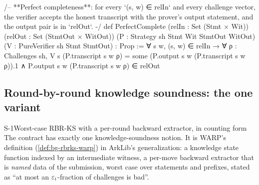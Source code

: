 \begin{leancode}[fontsize=\footnotesize,label={\footnotesize Contract/Security.lean (abridged)}]
/-- **Perfect completeness**: for every `(s, w) ∈ relIn` and every challenge vector, the verifier
accepts the honest transcript with the prover's output statement, and the output pair is in
`relOut`. -/
def PerfectComplete (relIn : Set (Stmt × Wit)) (relOut : Set (StmtOut × WitOut))
    (P : Strategy sh Stmt Wit StmtOut WitOut) (V : PureVerifier sh Stmt StmtOut) : Prop :=
  ∀ s w, (s, w) ∈ relIn → ∀ ρ : Challenges sh,
    V s (P.transcript s w ρ) = some (P.output s w (P.transcript s w ρ)).1 ∧
      P.output s w (P.transcript s w ρ) ∈ relOut
\end{leancode}

\subsection{Round-by-round knowledge soundness: the one variant}\label{subsec:sec-rbrks}

\begin{decision}{S-1}{Worst-case RBR-KS with a per-round backward extractor, in counting form}
The contract has exactly one knowledge-soundness notion. It is WARP's definition
\cite[Defs.~4.1--4.2, informally 2.6--2.7]{BCFW25-WARP} (\cref{def:bg-rbrks-warp}) in ArkLib's generalization: a
knowledge state function indexed by an intermediate witness, a per-move backward extractor that is
\emph{named} data of the submission, worst case over statements and prefixes, stated as \enquote{at
most an $\varepsilon_i$-fraction of challenges is bad}.
\end{decision}

